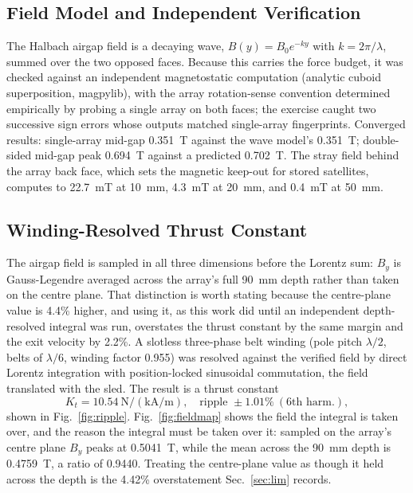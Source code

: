 \documentclass[conference]{IEEEtran}
\begin{document}
\subsection{Field Model and Independent Verification}
The Halbach airgap field is a decaying wave, $B(y)=B_0e^{-ky}$ with $k=2\pi/\lambda$, summed over the two opposed faces. Because this carries the force budget, it was checked against an independent magnetostatic computation (analytic cuboid superposition, magpylib), with the array rotation-sense convention determined empirically by probing a single array on both faces; the exercise caught two successive sign errors whose outputs matched single-array fingerprints. Converged results: single-array mid-gap 0.351~T against the wave model's 0.351~T; double-sided mid-gap peak 0.694~T against a predicted 0.702~T. The stray field behind the array back face, which sets the magnetic keep-out for stored satellites, computes to 22.7~mT at 10~mm, 4.3~mT at 20~mm, and 0.4~mT at 50~mm.

\subsection{Winding-Resolved Thrust Constant}
The airgap field is sampled in all three dimensions before the Lorentz sum: $B_y$ is Gauss-Legendre averaged across the array's full 90~mm depth rather than taken on the centre plane. That distinction is worth stating because the centre-plane value is 4.4\% higher, and using it, as this work did until an independent depth-resolved integral was run, overstates the thrust constant by the same margin and the exit velocity by 2.2\%.
A slotless three-phase belt winding (pole pitch $\lambda/2$, belts of $\lambda/6$, winding factor 0.955) was resolved against the verified field by direct Lorentz integration with position-locked sinusoidal commutation, the field translated with the sled. The result is a thrust constant
\begin{equation}
K_t = 10.54~\mathrm{N/(kA/m)},\quad \text{ripple } \pm1.01\%\ (6\text{th harm.}),
\end{equation}
shown in Fig.~\ref{fig:ripple}. Fig.~\ref{fig:fieldmap} shows the field the integral is taken over, and the reason the integral must be taken over it: sampled on the array's centre plane $B_y$ peaks at 0.5041~T, while the mean across the 90~mm depth is 0.4759~T, a ratio of 0.9440. Treating the centre-plane value as though it held across the depth is the 4.42\% overstatement Sec.~\ref{sec:lim} records.
\end{document}
